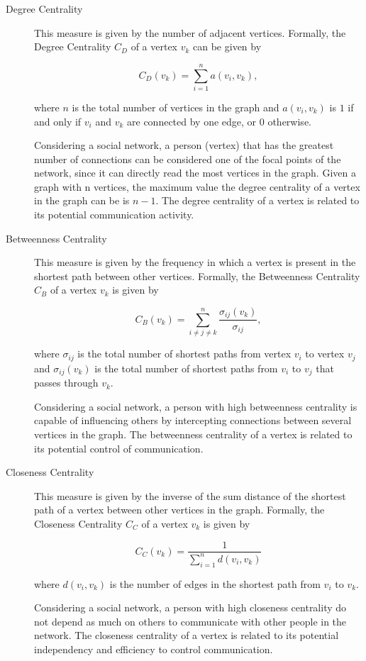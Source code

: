 \begin{description}
\item[Degree Centrality] This measure is given by the number of adjacent vertices. Formally, the Degree Centrality $C_D$ of a vertex $v_k$ can be given by

\begin{equation}
C_D(v_k) = \sum_{i=1}^{n} a(v_i, v_k),
\end{equation}

where $n$ is the total number of vertices in the graph and $a(v_i, v_k)$ is $1$ if and only if $v_i$ and $v_k$ are connected by one edge, or $0$ otherwise.

Considering a social network, a person (vertex) that has the greatest number of connections can be considered one of the focal points of the network, since it can directly read the most vertices in the graph. Given a graph with n vertices, the maximum value the degree centrality of a vertex in the graph can be is $n-1$. The degree centrality of a vertex is related to its potential communication activity.

\item[Betweenness Centrality] This measure is given by the frequency in which a vertex is present in the shortest path between other vertices. Formally, the Betweenness Centrality $C_B$ of a vertex $v_k$ is given by

\begin{equation}
C_B(v_k) = \sum_{i \neq j \neq k}^{n} \frac{\sigma_{ij}(v_k)}{\sigma_{ij}},
\end{equation}

where $\sigma_{ij}$ is the total number of shortest paths from vertex $v_i$ to vertex $v_j$ and $\sigma_{ij}(v_k)$ is the total number of shortest paths from $v_i$ to $v_j$ that passes through $v_k$.

Considering a social network, a person with high betweenness centrality is capable of influencing others by intercepting connections between several vertices in the graph. The betweenness centrality of a vertex is related to its potential control of communication.

\item[Closeness Centrality] This measure is given by the inverse of the sum distance of the shortest path of a vertex between other vertices in the graph. Formally, the Closeness Centrality $C_C$ of a vertex $v_k$ is given by

\begin{equation}
C_C(v_k) = \frac{1} {\sum_{i=1}^{n} d(v_i, v_k)}
\end{equation}

where $d(v_i, v_k)$ is the number of edges in the shortest path from $v_i$ to $v_k$.

Considering a social network, a person with high closeness centrality do not depend as much on others to communicate with other people in the network. The closeness centrality of a vertex is related to its potential independency and efficiency to control communication.
\end{description}

